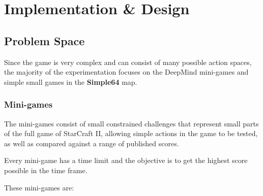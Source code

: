 \chapter{Implementation \& Design}%
\label{implem}

\section{Problem Space}
Since the game is very complex and can consist of many possible action spaces,
the majority of the experimentation focuses on the DeepMind mini-games
and simple small games in the \textbf{Simple64} map.

\subsection{Mini-games}

The mini-games consist of small constrained challenges that represent
small parts of the full game of StarCraft II, allowing simple actions
in the game to be tested, as well as compared against a range of
published scores.

Every mini-game has a time limit and the objective is to get the
highest score possible in the time frame.

These mini-games are:

